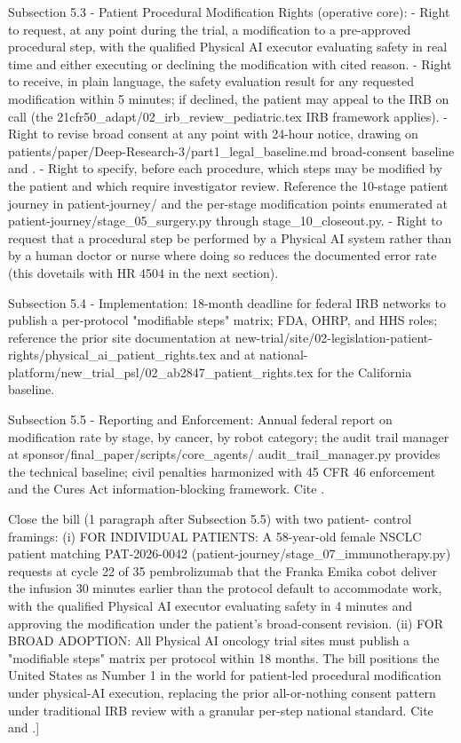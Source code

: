Subsection 5.3 - Patient Procedural Modification Rights (operative
core):
- Right to request, at any point during the trial, a modification to
  a pre-approved procedural step, with the qualified Physical AI
  executor evaluating safety in real time and either executing or
  declining the modification with cited reason.
- Right to receive, in plain language, the safety evaluation result
  for any requested modification within 5 minutes; if declined, the
  patient may appeal to the IRB on call (the
  21cfr50\_adapt/02\_irb\_review\_pediatric.tex IRB framework applies).
- Right to revise broad consent at any point with 24-hour notice,
  drawing on patients/paper/Deep-Research-3/part1\_legal\_baseline.md
  broad-consent baseline and \cite{ohrp_broad_consent_attachment_c_2017}.
- Right to specify, before each procedure, which steps may be
  modified by the patient and which require investigator review.
  Reference the 10-stage patient journey in patient-journey/ and the
  per-stage modification points enumerated at
  patient-journey/stage\_05\_surgery.py through
  stage\_10\_closeout.py.
- Right to request that a procedural step be performed by a
  Physical AI system rather than by a human doctor or nurse where
  doing so reduces the documented error rate (this dovetails with
  HR 4504 in the next section).

Subsection 5.4 - Implementation: 18-month deadline for federal IRB
networks to publish a per-protocol "modifiable steps" matrix; FDA,
OHRP, and HHS roles; reference the prior site documentation at
new-trial/site/02-legislation-patient-rights/physical\_ai\_patient\_rights.tex
and at
national-platform/new\_trial\_psl/02\_ab2847\_patient\_rights.tex for the
California baseline.

Subsection 5.5 - Reporting and Enforcement: Annual federal report on
modification rate by stage, by cancer, by robot category; the audit
trail manager at sponsor/final\_paper/scripts/core\_agents/
audit\_trail\_manager.py provides the technical baseline; civil
penalties harmonized with 45 CFR 46 enforcement and the Cures Act
information-blocking framework. Cite
\cite{federal_register_info_blocking_disincentives_2024}.

Close the bill (1 paragraph after Subsection 5.5) with two patient-
control framings:
(i) FOR INDIVIDUAL PATIENTS: A 58-year-old female NSCLC patient
    matching PAT-2026-0042 (patient-journey/stage\_07\_immunotherapy.py)
    requests at cycle 22 of 35 pembrolizumab that the Franka Emika
    cobot deliver the infusion 30 minutes earlier than the protocol
    default to accommodate work, with the qualified Physical AI
    executor evaluating safety in 4 minutes and approving the
    modification under the patient's broad-consent revision.
(ii) FOR BROAD ADOPTION: All Physical AI oncology trial sites must
     publish a "modifiable steps" matrix per protocol within 18
     months. The bill positions the United States as Number 1 in
     the world for patient-led procedural modification under
     physical-AI execution, replacing the prior all-or-nothing
     consent pattern under traditional IRB review with a granular
     per-step national standard. Cite \cite{kawchak_2026_18973368}
     and \cite{kawchak_2026_19119939}.]
